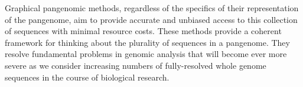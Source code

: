 Graphical pangenomic methods, regardless of the specifics of their representation of the pangenome, aim to provide accurate and unbiased access to this collection of sequences with minimal resource costs.
These methods provide a coherent framework for thinking about the plurality of sequences in a pangenome.
They resolve fundamental problems in genomic analysis that will become ever more severe as we consider increasing numbers of fully-resolved whole genome sequences in the course of biological research.

